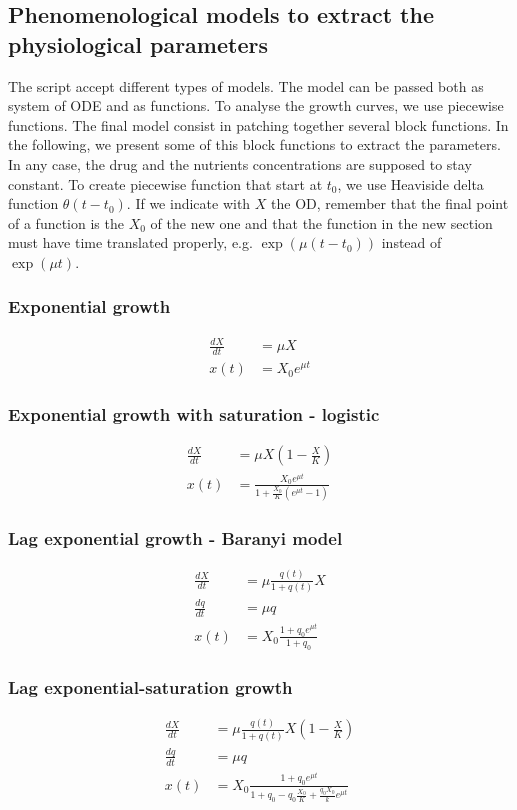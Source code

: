 \documentclass{article}
\begin{document}
\subsection{Phenomenological models to extract the physiological parameters}
The script accept different types of models. The model can be passed both as system of ODE and as functions. To analyse the growth curves, we use piecewise functions. The final model consist in patching together several block functions. In the following, we present some of this block functions to extract the parameters. In any case, the drug and the nutrients concentrations are supposed to stay constant. To create piecewise function that start at $t_0$, we use Heaviside delta function $\theta(t-t_0)$. If we indicate with $X$ the OD, remember that the final point of a function is the $X_0$ of the new one and that the function in the new section must have time translated properly, e.g. $\exp (\mu (t-t_0))$ instead of $\exp (\mu t)$.

\subsubsection{Exponential growth}
\begin{align}
\frac{dX}{dt} &= \mu X \\
x(t) &= X_0 e^{\mu t}
\end{align}

\subsubsection{Exponential growth with saturation - logistic}
\begin{align}
\frac{dX}{dt} &= \mu X \left( 1 - \frac{X}{K} \right) \\
x(t) &= \frac{ X_0 e^{\mu t}}{1 + \frac{X_0}{K} (e^{\mu t}-1)}
\end{align}

\subsubsection{Lag exponential growth - Baranyi model}
\begin{align}
\frac{dX}{dt} &= \mu \frac{q(t)}{1+q(t)} X \\
\frac{dq}{dt} &= \mu q\\
x(t) &= X_0 \frac{1+q_0 e^{\mu t}}{1+q_0}
\end{align}

\subsubsection{Lag exponential-saturation growth}
\begin{align}
\frac{dX}{dt} &= \mu \frac{q(t)}{1+q(t)} X \left( 1 - \frac{X}{K} \right)\\
\frac{dq}{dt} &= \mu q\\
x(t) &= X_0 \frac{1+q_0 e^{\mu t}}{1+q_0 -q_0 \frac{X_0}{K} + \frac{q_0 X_0}{k} e^{\mu t}}
\end{align}
\end{document}
